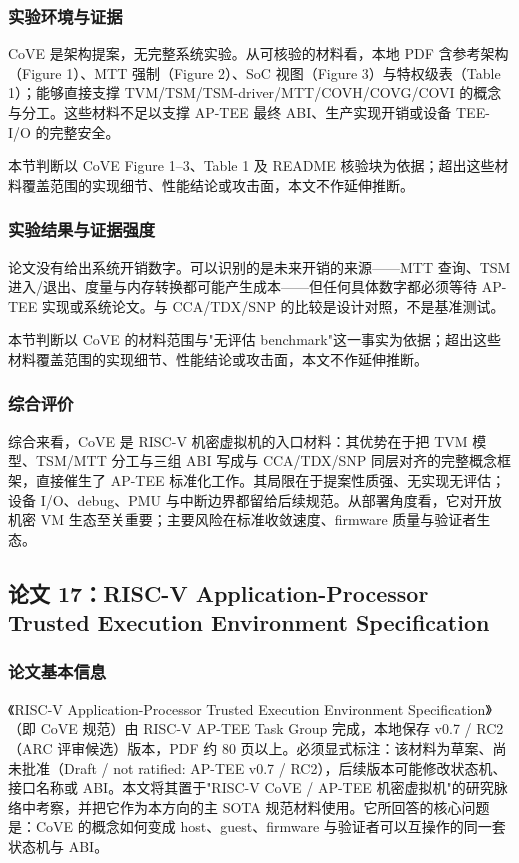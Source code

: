 \documentclass[11pt]{ctexart}
\begin{document}
\subsubsection{实验环境与证据}
CoVE 是架构提案，无完整系统实验。从可核验的材料看，本地 PDF 含参考架构（Figure 1）、MTT 强制（Figure 2）、SoC 视图（Figure 3）与特权级表（Table 1）；能够直接支撑 TVM/TSM/TSM-driver/MTT/COVH/COVG/COVI 的概念与分工。这些材料不足以支撑 AP-TEE 最终 ABI、生产实现开销或设备 TEE-I/O 的完整安全。\par
本节判断以 CoVE Figure 1--3、Table 1 及 README 核验块为依据；超出这些材料覆盖范围的实现细节、性能结论或攻击面，本文不作延伸推断。\par
\subsubsection{实验结果与证据强度}
论文没有给出系统开销数字。可以识别的是未来开销的来源——MTT 查询、TSM 进入/退出、度量与内存转换都可能产生成本——但任何具体数字都必须等待 AP-TEE 实现或系统论文。与 CCA/TDX/SNP 的比较是设计对照，不是基准测试。\par
本节判断以 CoVE 的材料范围与"无评估 benchmark"这一事实为依据；超出这些材料覆盖范围的实现细节、性能结论或攻击面，本文不作延伸推断。\par
\subsubsection{综合评价}
综合来看，CoVE 是 RISC-V 机密虚拟机的入口材料：其优势在于把 TVM 模型、TSM/MTT 分工与三组 ABI 写成与 CCA/TDX/SNP 同层对齐的完整概念框架，直接催生了 AP-TEE 标准化工作。其局限在于提案性质强、无实现无评估；设备 I/O、debug、PMU 与中断边界都留给后续规范。从部署角度看，它对开放机密 VM 生态至关重要；主要风险在标准收敛速度、firmware 质量与验证者生态。\par
\subsection{论文 17：RISC-V Application-Processor Trusted Execution Environment Specification}
\subsubsection{论文基本信息}
《RISC-V Application-Processor Trusted Execution Environment Specification》（即 CoVE 规范）由 RISC-V AP-TEE Task Group 完成，本地保存 v0.7 / RC2（ARC 评审候选）版本，PDF 约 80 页以上。必须显式标注：该材料为草案、尚未批准（Draft / not ratified: AP-TEE v0.7 / RC2），后续版本可能修改状态机、接口名称或 ABI。本文将其置于"RISC-V CoVE / AP-TEE 机密虚拟机"的研究脉络中考察，并把它作为本方向的主 SOTA 规范材料使用。它所回答的核心问题是：CoVE 的概念如何变成 host、guest、firmware 与验证者可以互操作的同一套状态机与 ABI。\cite{riscv_ap_tee_2024}\par
\end{document}
